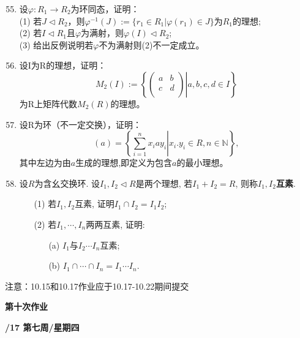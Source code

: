 \documentclass[a4paper,12pt]{article}
\begin{document}
\begin{enumerate}\setcounter{enumi}{54}

    \item 设$\varphi:R_1 \to R_2 $为环同态，证明：\\
    (1) 若$J\triangleleft R_2$，则$\varphi^{-1}(J):=\{r_1\in R_1|\varphi(r_1)\in J\}$为$R_1$的理想;\\
    (2) 若$I\triangleleft R_1$且$\varphi$为满射，则$\varphi(I)\triangleleft R_2$;\\
    (3) 给出反例说明若$\varphi$不为满射则(2)不一定成立。
    
    \item 设I为R的理想，证明：
    $$M_2(I):=\left\{\left. \begin{pmatrix} a & b \\ c & d\\\end{pmatrix}\right| a,b,c,d\in I\right\}$$
    为R上矩阵代数$M_2(R)$的理想。
    \item 设R为环（不一定交换），证明：
    $$(a)=\left\{\left.\sum_{i=1}^n x_iay_i\right|x_i.y_i\in R,n\in \mathbb{N}\right\},$$
    其中左边为由$a$生成的理想,即定义为包含$a$的最小理想。
    \item 设$R$为含幺交换环. 设$I_1,I_2\triangleleft R$是两个理想, 若$I_1+I_2=R$, 则称$I_1,I_2$\textbf{互素}.
 \begin{itemize}
 \item[(1)] 若$I_1,I_2$互素, 证明$I_1\cap I_2=I_1I_2$;
 \item[(2)] 若$I_1,\cdots,I_n$两两互素, 证明:
 \begin{itemize}
 \item[(a)] $I_1$与$I_2\cdots I_n$互素;
 \item[(b)] $I_1\cap\cdots\cap I_n=I_1\cdots I_n$.
 \end{itemize}
 \end{itemize}
\end{enumerate}


{\color{red} 注意：10.15和10.17作业应于10.17-10.22期间提交}

\newpage
\head

 \begin{center} %
	{\Large \bf 第十次作业} %
	\vspace{2mm}
	
	{\bf{}/17 \quad  第七周/星期四} %
\end{center} 
\end{document}
